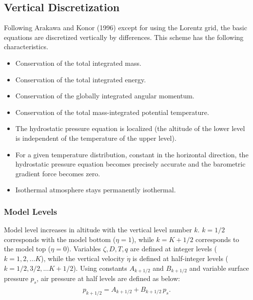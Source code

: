 \hypertarget{vertical-discretization}{%
\subsection{Vertical Discretization}\label{vertical-discretization}}

Following Arakawa and Konor (1996) except for using the Lorentz grid, the basic equations are discretized vertically by differences. This scheme has the following characteristics.

\begin{itemize}
\item
  Conservation of the total integrated mass.
\item
  Conservation of the total integrated energy.
\item
  Conservation of the globally integrated angular momentum.
\item
  Conservation of the total mass-integrated potential temperature.
\item
  The hydrostatic pressure equation is localized (the altitude of the lower level is independent of the temperature of the upper level).
\item
  For a given temperature distribution, constant in the horizontal direction, the hydrostatic pressure equation becomes precisely accurate and the barometric gradient force becomes zero.
\item
  Isothermal atmosphere stays permanently isothermal.
\end{itemize}

\hypertarget{model-levels}{%
\subsubsection{Model Levels}\label{model-levels}}

Model level increases in altitude with the vertical level number \(k\). \(k=1/2\) corresponds with the model bottom (\(\eta=1\)), while \(k=K+1/2\) corresponds to the model top (\(\eta=0\)). Variables
\(\zeta,D,T,q\) are defined at integer levels (\(k=1,2,\ldots K\)), while the vertical velocity \(\dot{\eta}\) is defined at half-integer levels (\(k=1/2,3/2,\ldots K+1/2\)). Using constants
\(A_{k+1/2}\) and \(B_{k+1/2}\) and variable surface pressure \(p_s\), air pressure at half levels are defined as below: \begin{eqnarray}\begin{aligned}
p_{k+1/2} = A_{k+1/2} +B_{k+1/2}\,p_s.\end{aligned}\end{eqnarray}

